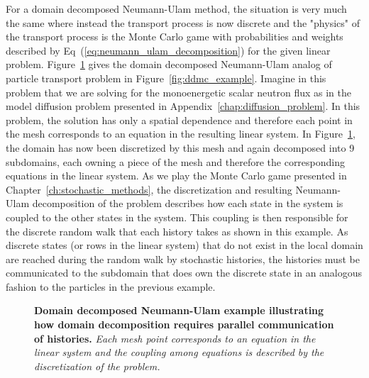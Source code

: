 For a domain decomposed Neumann-Ulam method, the situation is very
much the same where instead the transport process is now discrete and
the "physics" of the transport process is the Monte Carlo game with
probabilities and weights described by
Eq~(\ref{eq:neumann_ulam_decomposition}) for the given linear
problem. Figure~\ref{fig:ddnu_example} gives the domain decomposed
Neumann-Ulam analog of particle transport problem in
Figure~\ref{fig:ddmc_example}. Imagine in this problem that we are
solving for the monoenergetic scalar neutron flux as in the model
diffusion problem presented in Appendix~\ref{chap:diffusion_problem}.
In this problem, the solution has only a spatial dependence and
therefore each point in the mesh corresponds to an equation in the
resulting linear system. In Figure~\ref{fig:ddnu_example}, the domain
has now been discretized by this mesh and again decomposed into 9
subdomains, each owning a piece of the mesh and therefore the
corresponding equations in the linear system. As we play the Monte
Carlo game presented in Chapter~\ref{ch:stochastic_methods}, the
discretization and resulting Neumann-Ulam decomposition of the problem
describes how each state in the system is coupled to the other states
in the system. This coupling is then responsible for the discrete
random walk that each history takes as shown in this example. As
discrete states (or rows in the linear system) that do not exist in
the local domain are reached during the random walk by stochastic
histories, the histories must be communicated to the subdomain that
does own the discrete state in an analogous fashion to the particles
in the previous example.
\begin{figure}[t!]
  \begin{center}
    \scalebox{1.5}{
       }
  \end{center}
  \caption{\textbf{Domain decomposed Neumann-Ulam example illustrating
      how domain decomposition requires parallel communication of
      histories.} \textit{Each mesh point corresponds to an equation
      in the linear system and the coupling among equations is
      described by the discretization of the problem.}}
  \label{fig:ddnu_example}
\end{figure}

